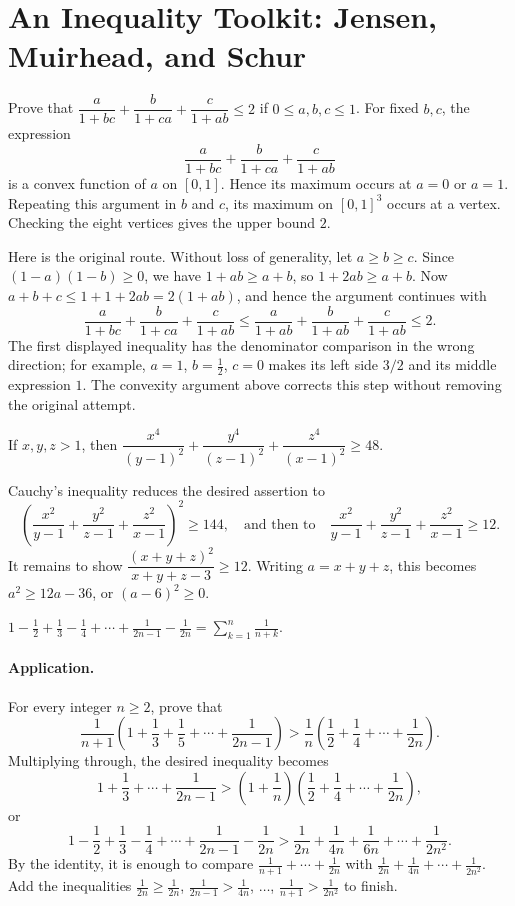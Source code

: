 \documentclass[11pt,a4paper]{article}
\begin{document}
\section*{An Inequality Toolkit: Jensen, Muirhead, and Schur}
Prove that $\dfrac a{1+bc}+\dfrac b{1+ca}+\dfrac c{1+ab}\leq2$ if
$0\leq a,b,c\leq1$.
For fixed $b,c$, the expression
\[
\frac a{1+bc}+\frac b{1+ca}+\frac c{1+ab}
\]
is a convex function of $a$ on $[0,1]$. Hence its maximum occurs at
$a=0$ or $a=1$. Repeating this argument in $b$ and $c$, its maximum on
$[0,1]^3$ occurs at a vertex. Checking the eight vertices gives the
upper bound $2$.

Here is the original route. Without loss of generality, let $a\geq b\geq c$.
Since $(1-a)(1-b)\geq0$, we have $1+ab\geq a+b$, so $1+2ab\geq a+b$.
Now $a+b+c\leq1+1+2ab=2(1+ab)$, and hence the argument continues with
\[
\frac a{1+bc}+\frac b{1+ca}+\frac c{1+ab}
\leq\frac a{1+ab}+\frac b{1+ab}+\frac c{1+ab}\leq2.
\]
The first displayed inequality has the denominator comparison in the wrong direction; for example, $a=1$, $b=\tfrac12$, $c=0$ makes its left side $3/2$ and its middle expression $1$. The convexity argument above corrects this step without removing the original attempt.

\setcounter{theorem}{14}\begin{lemma}
If $x,y,z>1$, then
$\dfrac{x^4}{(y-1)^2}+\dfrac{y^4}{(z-1)^2}+\dfrac{z^4}{(x-1)^2}\geq48$.
\end{lemma}
Cauchy's inequality reduces the desired assertion to
\[
\left(\frac{x^2}{y-1}+\frac{y^2}{z-1}+\frac{z^2}{x-1}\right)^2\geq144,
\quad\text{and then to}\quad
\frac{x^2}{y-1}+\frac{y^2}{z-1}+\frac{z^2}{x-1}\geq12.
\]
It remains to show
$\dfrac{(x+y+z)^2}{x+y+z-3}\geq12$.
Writing $a=x+y+z$, this becomes
$a^2\geq12a-36$, or $(a-6)^2\geq0$.

\setcounter{theorem}{21}\begin{lemma}
$1-\frac12+\frac13-\frac14+\cdots+\frac1{2n-1}-\frac1{2n}
=\sum_{k=1}^n\frac1{n+k}$.
\end{lemma}
\paragraph{Application.}
For every integer $n\geq2$, prove that
\[
\frac1{n+1}\left(1+\frac13+\frac15+\cdots+\frac1{2n-1}\right)
>\frac1n\left(\frac12+\frac14+\cdots+\frac1{2n}\right).
\]
Multiplying through, the desired inequality becomes
\[
1+\frac13+\cdots+\frac1{2n-1}
>\left(1+\frac1n\right)\left(\frac12+\frac14+\cdots+\frac1{2n}\right),
\]
or
\[
1-\frac12+\frac13-\frac14+\cdots+\frac1{2n-1}-\frac1{2n}
>\frac1{2n}+\frac1{4n}+\frac1{6n}+\cdots+\frac1{2n^2}.
\]
By the identity, it is enough to compare
$\frac1{n+1}+\cdots+\frac1{2n}$ with $\frac1{2n}+\frac1{4n}+\cdots+\frac1{2n^2}$.
Add the inequalities
$\frac1{2n}\geq\frac1{2n}$, $\frac1{2n-1}>\frac1{4n}$, $\ldots$,
$\frac1{n+1}>\frac1{2n^2}$ to finish.
\end{document}
